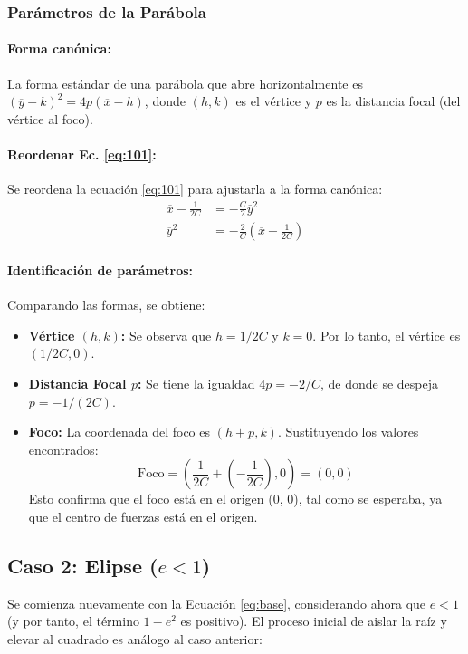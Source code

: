 \documentclass[12pt, a4paper]{article}
\newcommand{\xbar}{\overline{x}}
\newcommand{\ybar}{\overline{y}}
\begin{document}
\subsubsection*{Parámetros de la Parábola}

\paragraph{Forma canónica:} La forma estándar de una parábola que abre horizontalmente es $(\ybar - k)^{2} = 4p(\xbar - h)$, donde $(h, k)$ es el vértice y $p$ es la distancia focal (del vértice al foco).

\paragraph{Reordenar Ec. \eqref{eq:101}:} Se reordena la ecuación \eqref{eq:101} para ajustarla a la forma canónica:
\begin{align*}
    \xbar - \frac{1}{2C} &= -\frac{C}{2}\ybar^{2} \\
    \ybar^{2} &= -\frac{2}{C}\left(\xbar - \frac{1}{2C}\right)
\end{align*}

\paragraph{Identificación de parámetros:} Comparando las formas, se obtiene:
\begin{itemize}
    \item \textbf{Vértice $(h, k)$:} Se observa que $h = 1/2C$ y $k = 0$. Por lo tanto, el vértice es $(1/2C, 0)$.
    \item \textbf{Distancia Focal $p$:} Se tiene la igualdad $4p = -2/C$, de donde se despeja $p = -1/(2C)$.
    \item \textbf{Foco:} La coordenada del foco es $(h+p, k)$. Sustituyendo los valores encontrados:
    \[
        \text{Foco} = \left(\frac{1}{2C} + \left(-\frac{1}{2C}\right), 0\right) = (0, 0)
    \]
    Esto confirma que el foco está en el origen (0, 0), tal como se esperaba, ya que el centro de fuerzas está en el origen.
\end{itemize}

\subsection{Caso 2: Elipse ($e<1$)}

Se comienza nuevamente con la Ecuación \eqref{eq:base}, considerando ahora que $e<1$ (y por tanto, el término $1-e^{2}$ es positivo). El proceso inicial de aislar la raíz y elevar al cuadrado es análogo al caso anterior:
\end{document}

